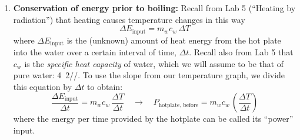\begin{itemize}
		\begin{enumerate}[label=(\roman*)]
		\item {\bf Conservation of energy prior to boiling:} Recall from Lab 5 (``Heating by radiation'') that heating causes temperature changes in this way
			\begin{equation*}
			\Delta E_\text{input} = m_w c_w \, \Delta T
			\end{equation*}
		where $\Delta E_\text{input}$ is the (unknown) amount of heat energy from the hot plate into the water over a certain interval of time, $\Delta t$.  Recall also from Lab 5 that $c_\text{w}$ is the {\em specific heat capacity} of water, which we will assume to be that of pure water: \unit{4.2}{\joule/\gram/\kelvin}.  To use the slope from our temperature graph, we divide this equation by $\Delta t$ to obtain:
			\begin{equation*}
			\frac{\Delta E_\text{input}}{\Delta t} = m_w c_w \, \frac{\Delta T}{\Delta t}\quad \rightarrow \quad P_\text{hotplate, before} = m_w c_w \,  \left(\frac{\Delta T}{\Delta t} \right)
			\end{equation*}
		where the energy per time provided by the hotplate can be called its ``power'' input.
		

\end{enumerate}
\end{itemize}
